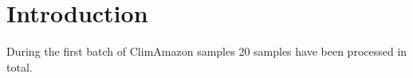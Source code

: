 \section{Introduction}
During the first batch of ClimAmazon samples 20 samples have been processed in total. 
